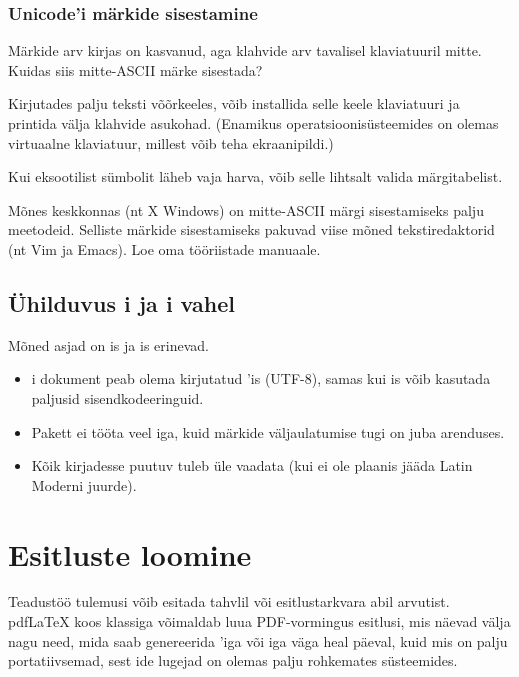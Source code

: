 \subsubsection{Unicode'i märkide sisestamine}

Märkide arv kirjas on kasvanud, aga klahvide arv tavalisel klaviatuuril
mitte. Kuidas siis mitte-ASCII märke sisestada?

Kirjutades palju teksti võõrkeeles, võib installida selle keele
klaviatuuri ja printida välja klahvide asukohad. (Enamikus
operatsioonisüsteemides on olemas virtuaalne klaviatuur, millest võib
teha ekraanipildi.)

Kui eksootilist sümbolit läheb vaja harva, võib selle lihtsalt valida
märgitabelist.

Mõnes keskkonnas (nt X Windows) on mitte-ASCII märgi sisestamiseks
palju meetodeid. Selliste märkide sisestamiseks pakuvad viise mõned
tekstiredaktorid (nt Vim ja Emacs). Loe oma tööriistade manuaale.

\subsection{Ühilduvus i ja i vahel}

Mõned asjad on is ja is erinevad.

\begin{itemize}
  \item {}i dokument peab olema kirjutatud 'is
(UTF-8), samas kui is võib kasutada paljusid
sisendkodeeringuid.
  \item Pakett  ei tööta veel iga, kuid
märkide väljaulatumise tugi on juba arenduses.
  \item Kõik kirjadesse puutuv tuleb üle vaadata (kui ei ole plaanis
jääda Latin Moderni juurde).
\end{itemize}

\section{Esitluste loomine}
\label{sec:beamer}
Teadustöö tulemusi võib esitada tahvlil või esitlustarkvara abil
arvutist. pdf\LaTeX{} koos klassiga
võimaldab luua PDF-vormingus esitlusi, mis näevad välja nagu need,
mida saab genereerida 'iga või iga väga heal
päeval, kuid mis on palju portatiivsemad, sest ide lugejad on
olemas palju rohkemates süsteemides.

